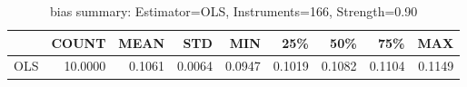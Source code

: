 \begin{table}[ht]
\centering
\caption{bias summary: Estimator=OLS, Instruments=166, Strength=0.90}
\begin{tabular}{lrrrrrrrr}
\toprule
 & COUNT & MEAN & STD & MIN & 25\% & 50\% & 75\% & MAX \\
\midrule
OLS & 10.0000 & 0.1061 & 0.0064 & 0.0947 & 0.1019 & 0.1082 & 0.1104 & 0.1149 \\
\bottomrule
\end{tabular}
\end{table}

